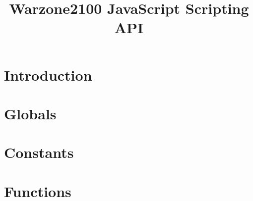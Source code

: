 \documentclass[12pt]{article}
\title{Warzone2100 JavaScript Scripting API}
\date{}
\begin{document}
\maketitle

\section{Introduction}

\section{Globals}

\flushleft
\begin{description}

\end{description}

\section{Constants}

\flushleft
\begin{description}

\end{description}

\section{Functions}


\end{document}
